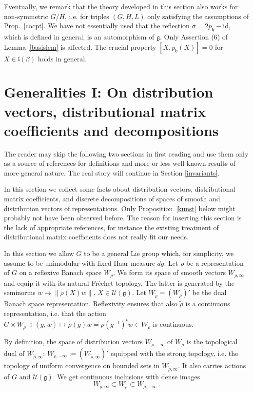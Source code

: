 \documentclass[10]{amsart}
\theoremstyle{remark}
\theoremstyle{definition}
\numberwithin{equation}{section}
\newcommand{\id}{\mathrm{id}}
\newcommand{\fg}{{\mathfrak g}}
\newcommand{\fh}{{\mathfrak h}}
\newcommand{\fl}{{\mathfrak l}}
\newcommand{\Cal}{\mathcal}
\begin{document}
{Eventually, we remark that the theory developed in this section also works for non-symmetric $G/H$, i.e. for triples $(G,H,L)$ only satisfying the assumptions of Prop.~\ref{cocpt}.
We have not essentially used that the reflection $\sigma=2p_\fh-\id$, which is defined in general, is an automorphism of $\fg$. Only Assertion (6) of Lemma~\ref{basislem} is affected.
The crucial property $[X,p_\fh (X)]=0$ for $X\in\fl(\beta)$ holds in general.



\section{Generalities I: On distribution vectors, distributional matrix coefficients and decompositions}\label{dist}

The reader may skip the following two sections in first reading and use them only as a source of references for definitions and more or less well-known
results of more general nature. The real story will continue in Section \ref{invariants}.

In this section we collect some facts about distribution vectors, distributional matrix coefficients, and discrete decompositions of spaces of smooth and distribution vectors of representations. Only Proposition~\ref{kunst} below might probably not have
been observed before. The reason for inserting this section is the lack of appropriate references, for instance the existing treatment \cite{He14} of distributional matrix coefficients does not really fit our needs. 

In this section we allow $G$ to be a general Lie group which, for simplicity, we assume to be unimodular with fixed Haar measure $dg$.
Let $\rho$ be a representation of $G$ on a reflexive Banach space $W_\rho$. We form its space of smooth vectors $W_{\rho,\infty}$ and equip it
with its natural Fr\'echet topology. The latter is generated by the seminorms $w\mapsto\| \rho(X)w\|$, $X\in {\Cal U}(\fg)$. Let $W_{\tilde \rho}=(W_\rho)'$ be the dual Banach space
representation. Reflexivity ensures that also $\tilde\rho$ is a continuous representation, i.e. that the action $G\times W_{\tilde \rho}\ni (g,\tilde w)\mapsto \tilde\rho(g)\tilde w=\rho(g^{-1})^t\tilde w\in W_{\tilde \rho}$
is continuous. 

By definition, the space of distribution vectors $W_{\rho,-\infty}$ of $W_\rho$ is the topological
dual of $W_{\tilde \rho,\infty}$: $W_{\rho,-\infty}:=(W_{\tilde \rho,\infty})'$ equipped with the strong topology, i.e. the topology of uniform convergence on bounded sets in $W_{\tilde \rho,\infty}$. It also carries actions of $G$ and ${\Cal U}(\fg)$.
We get continuous inclusions with dense images 
$$W_{\rho,\infty}\subset W_{\rho}\subset W_{\rho,-\infty}\ .$$

}
\end{document}
